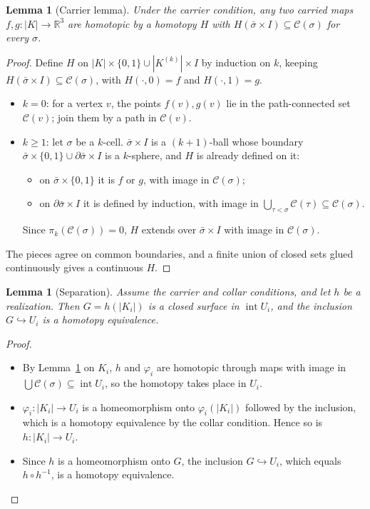 \documentclass[preprint,12pt]{elsarticle}
\newtheorem{lemma}[theorem]{Lemma}
\theoremstyle{definition}
\theoremstyle{remark}
\newcommand{\R}{\mathbb{R}}
\newcommand{\C}{\mathcal{C}}
\newcommand{\inter}{\operatorname{int}}
\begin{document}
\begin{lemma}[Carrier lemma]\label{lem:carrier}
Under the carrier condition, any two carried maps $f,g\colon|K|\to\R^3$ are homotopic by a homotopy $H$ with
$H(\bar\sigma\times I)\subseteq\C(\sigma)$ for every $\sigma$.
\end{lemma}
\begin{proof}
Define $H$ on $|K|\times\{0,1\}\cup|K^{(k)}|\times I$ by induction on $k$, keeping $H(\bar\sigma\times I)
\subseteq\C(\sigma)$, with $H(\cdot,0)=f$ and $H(\cdot,1)=g$.
\begin{itemize}
\item $k=0$: for a vertex $v$, the points $f(v),g(v)$ lie in the path-connected set $\C(v)$; join them by a
path in $\C(v)$.
\item $k\ge1$: let $\sigma$ be a $k$-cell. $\bar\sigma\times I$ is a $(k+1)$-ball whose boundary
$\bar\sigma\times\{0,1\}\cup\partial\bar\sigma\times I$ is a $k$-sphere, and $H$ is already defined on it:
  \begin{itemize}
  \item on $\bar\sigma\times\{0,1\}$ it is $f$ or $g$, with image in $\C(\sigma)$;
  \item on $\partial\bar\sigma\times I$ it is defined by induction, with image in
  $\bigcup_{\tau<\sigma}\C(\tau)\subseteq\C(\sigma)$.
  \end{itemize}
  Since $\pi_k(\C(\sigma))=0$, $H$ extends over $\bar\sigma\times I$ with image in $\C(\sigma)$.
\end{itemize}
The pieces agree on common boundaries, and a finite union of closed sets glued continuously gives a continuous
$H$.
\end{proof}

\begin{lemma}[Separation]\label{lem:separation}
Assume the carrier and collar conditions, and let $h$ be a realization. Then $G=h(|K_i|)$ is a closed surface in
$\inter U_i$, and the inclusion $G\hookrightarrow U_i$ is a homotopy equivalence.
\end{lemma}
\begin{proof}
\begin{itemize}
\item By Lemma~\ref{lem:carrier} on $K_i$, $h$ and $\varphi_i$ are homotopic through maps with image in
$\bigcup\C(\sigma)\subseteq\inter U_i$, so the homotopy takes place in $U_i$.
\item $\varphi_i\colon|K_i|\to U_i$ is a homeomorphism onto $\varphi_i(|K_i|)$ followed by the inclusion, which is a
homotopy equivalence by the collar condition. Hence so is $h\colon|K_i|\to U_i$.
\item Since $h$ is a homeomorphism onto $G$, the inclusion $G\hookrightarrow U_i$, which equals $h\circ h^{-1}$,
is a homotopy equivalence.
\end{itemize}
\end{proof}
\end{document}
